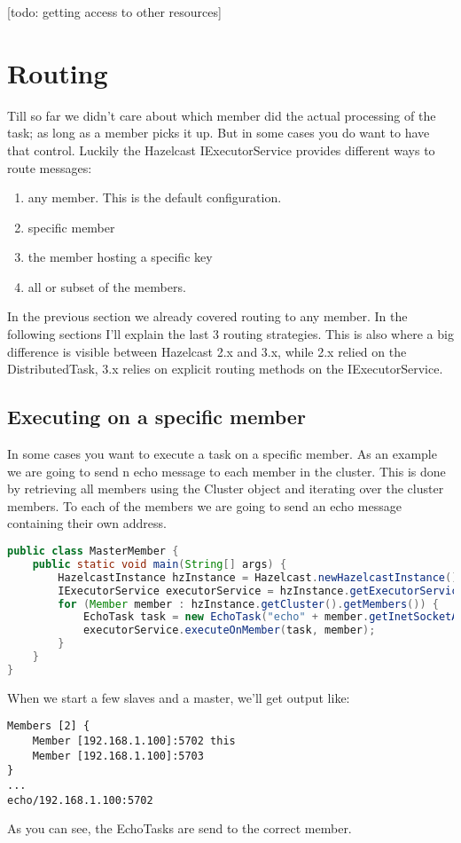 [todo: getting access to other resources]

\section{Routing}
Till so far we didn't care about which member did the actual processing of the task; as long as a member picks it up. But in some cases you do want to have that control. Luckily the Hazelcast IExecutorService provides different ways to route messages:
\begin{enumerate}
\item any member. This is the default configuration.
\item specific member
\item the member hosting a specific key
\item all or subset of the members.
\end{enumerate}
In the previous section we already covered routing to any member. In the following sections I'll explain the last 3 routing strategies. This is also where a big difference is visible between Hazelcast 2.x and 3.x, while 2.x relied on the DistributedTask, 3.x relies on explicit routing methods on the IExecutorService.

\subsection{Executing on a specific member}
In some cases you want to execute a task on a specific member. As an example we are going to send n echo message to each member in the cluster. This is done by retrieving all members using the Cluster object and iterating over the cluster members. To each of the members we are going to send an echo message containing their own address. 
\begin{lstlisting}[language=java]
public class MasterMember {
    public static void main(String[] args) {
        HazelcastInstance hzInstance = Hazelcast.newHazelcastInstance();
        IExecutorService executorService = hzInstance.getExecutorService("executor");
        for (Member member : hzInstance.getCluster().getMembers()) {
            EchoTask task = new EchoTask("echo" + member.getInetSocketAddress());
            executorService.executeOnMember(task, member);
        }
    }
}
\end{lstlisting}
When we start a few slaves and a master, we'll get output like:
\begin{lstlisting}
Members [2] {
	Member [192.168.1.100]:5702 this
	Member [192.168.1.100]:5703
}
...
echo/192.168.1.100:5702
\end{lstlisting}
As you can see, the EchoTasks are send to the correct member.

